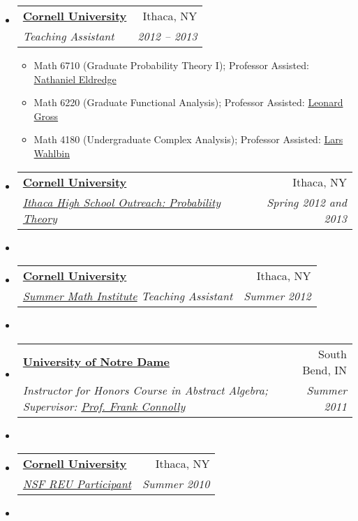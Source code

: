 \documentclass[letterpaper,11pt]{article}
\makeatletter
\newcommand{\resitem}[1]{\item #1 \vspace{-2pt}}
\newenvironment{widetable}[1]
	       {\begin{tabular*}{#1}[t]{l@{\extracolsep{\fill}}r}}
	       {\end{tabular*}}
\newcommand{\ressubheading}[4]{
  \begin{widetable}{\textwidth - 28pt}
		\textbf{#1} & #2 \\
		\textit{#3} & \textit{#4} \\
  \end{widetable}
  \vspace{-12pt}}
\makeatother
\begin{document}
\begin{itemize}[noitemsep,nolistsep,label={}]
\item
  \ressubheading{\href{http://www.math.cornell.edu}{Cornell University}}
		{Ithaca, NY}
		{Teaching Assistant}
		{2012 -- 2013}
              	\begin{itemize}
		 \resitem{Math 6710 (Graduate
                    Probability Theory I); Professor Assisted: \href{http://www.math.cornell.edu/~neldredge/}{Nathaniel Eldredge}}
                    \resitem{Math 6220 (Graduate Functional Analysis); Professor Assisted: \href{http://www.math.cornell.edu/People/Faculty/grossl.html}{Leonard Gross}}
                     \resitem{Math 4180 (Undergraduate Complex Analysis); Professor Assisted: \href{http://www.math.cornell.edu/People/Faculty/wahlbin.html}{Lars Wahlbin}}
		\end{itemize}
				  \item
  \ressubheading{\href{http://www.math.cornell.edu}{Cornell University}}
		{Ithaca, NY}
		{\href{http://www.math.cornell.edu/Community/enrichment.html}{Ithaca High School Outreach: Probability Theory}}
		{Spring 2012 and 2013}
		\item
		\item
  \ressubheading{\href{http://www.math.cornell.edu}{Cornell University}}
		{Ithaca, NY}
		{\href{http://www.math.cornell.edu/~smi/}{Summer Math Institute} Teaching Assistant}
		{Summer 2012}
		\item
		\item
  \ressubheading{\href{http://www.math.nd.edu}{University of Notre Dame}}
		{South Bend, IN}
		{Instructor for
                    Honors Course in Abstract Algebra; Supervisor: \href{http://math.nd.edu/people/faculty/francis-x-connolly/}{Prof. Frank Connolly}}
		{Summer 2011}
		\item
		\item
		  \ressubheading{\href{http://www.math.cornell.edu}{Cornell University}}
		{Ithaca, NY}
		{\href{http://www.math.cornell.edu/~reu/}{NSF REU Participant}}
		{Summer 2010}
		\item

\end{itemize}
\end{document}

